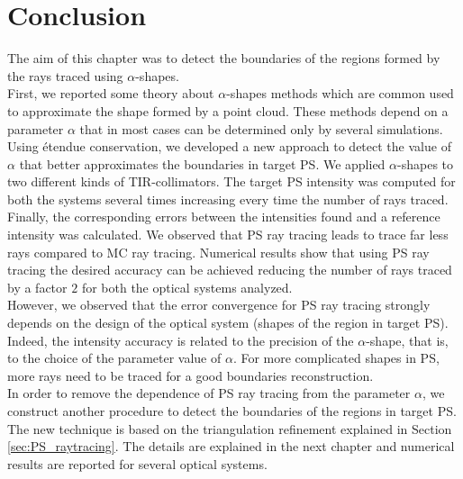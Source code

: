 \section{Conclusion}
The aim of this chapter was to detect the boundaries of the regions formed by the rays traced using $\alpha$-shapes.\\
\indent First, we reported some theory about $\alpha$-shapes methods which are common used to approximate the shape formed by a point cloud. 
These methods depend on a parameter $\alpha$ that in most cases can be determined only by several simulations. 
\\ \indent Using \'{e}tendue conservation, we developed a new approach to detect the value of $\alpha$ that better approximates the boundaries in target PS. 
We applied $\alpha$-shapes to two different kinds of TIR-collimators. The target PS intensity was computed for both the systems several times increasing every time the number of rays traced. Finally, the corresponding errors between the intensities found and a reference intensity was calculated. We observed that PS ray tracing leads to trace far less rays compared to MC ray tracing. Numerical results show that using PS ray tracing the desired accuracy can be achieved reducing the number of rays traced by a factor $2$ for both the optical systems analyzed.\\ \indent 
However, we observed that the error convergence for PS ray tracing strongly depends on the design of the optical system (shapes of the region in target PS). Indeed, the intensity accuracy is related to the precision of the $\alpha$-shape, that is, to the choice of the parameter value of $\alpha$. For more complicated shapes in PS, more rays need to be traced for a good boundaries reconstruction.\\ \indent
In order to remove the dependence of PS ray tracing from the parameter $\alpha$, we construct another procedure to detect the boundaries of the regions in target PS. 
The new technique is based on the triangulation refinement explained in Section \ref{sec:PS_raytracing}. The details are explained in the next chapter and numerical results are reported for several optical systems. 











































